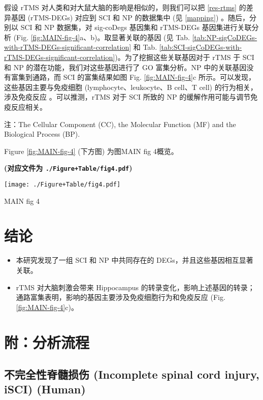 \documentclass[
]{article}
\providecommand{\tightlist}{%
  \setlength{\itemsep}{0pt}\setlength{\parskip}{0pt}}
\begin{document}
假设 rTMS 对人类和对大鼠大脑的影响是相似的，则我们可以把 \ref{res-rtms} 的差异基因 (rTMS-DEGs) 对应到 SCI 和 NP 的数据集中 (见 \ref{mapping}) 。随后，分别以 SCI 和 NP 数据集，对 sig-coDegs 基因集和 rTMS-DEGs 基因集进行关联分析 (Fig. \ref{fig:MAIN-fig-4}a、b)。取显著关联的基因 (见 Tab. \ref{tab:NP-sigCoDEGs-with-rTMS-DEGs-significant-correlation} 和 Tab. \ref{tab:SCI-sigCoDEGs-with-rTMS-DEGs-significant-correlation})。为了挖掘这些关联基因对于 rTMS 于 SCI 和 NP 的潜在功能，我们对这些基因进行了 GO 富集分析。NP 中的关联基因没有富集到通路，而 SCI 的富集结果如图 Fig. \ref{fig:MAIN-fig-4}c 所示。可以发现，这些基因主要与免疫细胞 (lymphocyte、leukocyte、B cell、T cell) 的行为相关，涉及免疫反应 。可以推测，rTMS 对于 SCI 所致的 NP 的缓解作用可能与调节免疫反应相关。

注：The Cellular Component (CC), the Molecular Function (MF) and the Biological Process (BP).

Figure \ref{fig:MAIN-fig-4} (下方图) 为图MAIN fig 4概览。

\textbf{(对应文件为 \texttt{./Figure+Table/fig4.pdf})}

\def\@captype{figure}
\begin{center}
\texttt{[image: ./Figure+Table/fig4.pdf]}
\caption{MAIN fig 4}\label{fig:MAIN-fig-4}
\end{center}

\hypertarget{dis}{%
\section{结论}\label{dis}}

\begin{itemize}
\tightlist
\item
  本研究发现了一组 SCI 和 NP 中共同存在的 DEGs，并且这些基因相互显著关联。
\item
  rTMS 对大脑刺激会带来 Hippocampus 的转录变化，影响上述基因的转录；通路富集表明，影响的基因主要涉及免疫细胞行为和免疫反应 (Fig. \ref{fig:MAIN-fig-4}c)。
\end{itemize}

\hypertarget{workflow}{%
\section{附：分析流程}\label{workflow}}

\hypertarget{ux4e0dux5b8cux5168ux6027ux810aux9ad3ux635fux4f24-incomplete-spinal-cord-injury-isci-human}{%
\subsection{不完全性脊髓损伤 (Incomplete spinal cord injury, iSCI) (Human)}\label{ux4e0dux5b8cux5168ux6027ux810aux9ad3ux635fux4f24-incomplete-spinal-cord-injury-isci-human}}
\end{document}
